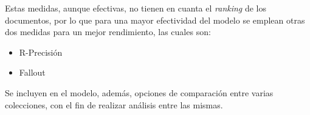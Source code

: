 Estas medidas, aunque efectivas, no tienen en cuanta el \emph{ranking} de los
documentos, por lo que para una mayor efectividad del modelo se emplean otras
dos medidas para un mejor rendimiento, las cuales son:

\begin{itemize}
    \item R-Precisión
    \item Fallout 
\end{itemize}

Se incluyen en el modelo, además, opciones de comparación entre varias
colecciones, con el fin de realizar análisis entre las mismas.